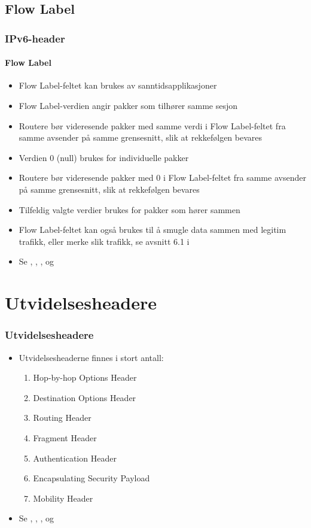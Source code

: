 \subsection{Flow Label}
\begin{frame}%
  \frametitle{IPv6-header}
  \framesubtitle{Flow Label}
  \pause
  \begin{itemize}[<+->]
  \item Flow Label-feltet kan brukes av sanntidsapplikasjoner
  \item Flow Label-verdien angir pakker som tilhører samme sesjon
  \item Routere bør videresende pakker med samme verdi i Flow
    Label-feltet fra samme avsender på samme grensesnitt, slik at
    rekkefølgen bevares
  \item Verdien 0 (null) brukes for individuelle pakker
  \item Routere bør videresende pakker med 0 i Flow Label-feltet fra
    samme avsender på samme grensesnitt, slik at rekkefølgen bevares
  \item Tilfeldig valgte verdier brukes for pakker som hører sammen
  \item Flow Label-feltet kan også brukes til å smugle data sammen med
    legitim trafikk, eller merke slik trafikk, se avsnitt 6.1 i
  \item Se , , ,  og 
  \end{itemize}
\end{frame}

\section{Utvidelsesheadere}
\begin{frame}%
  \frametitle{Utvidelsesheadere}
  \pause
  \begin{itemize}[<+->]
  \item Utvidelsesheaderne finnes i stort antall:
    \begin{enumerate}[<+->]
    \item Hop-by-hop Options Header
    \item Destination Options Header
    \item Routing Header
    \item Fragment Header
    \item Authentication Header
    \item Encapsulating Security Payload
    \item Mobility Header
    \end{enumerate}
  \item Se , , ,  og
  \end{itemize}
\end{frame}

